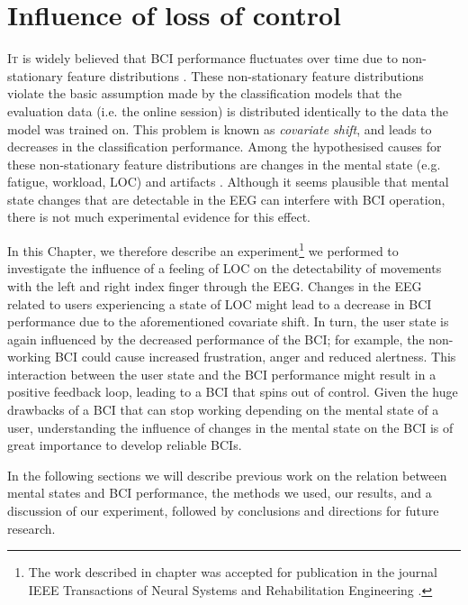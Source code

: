 \chapter{Influence of loss of control}
\label{chap:loc}

\lettrine{I}{t} is widely believed that \ac{BCI} performance fluctuates over
time due to non-stationary feature distributions \cite{mueller2008mlr,
blankertz2007ics, bunau2009ssa, vidal1977rtd, shenoy2006tac, krauledat2008tzt,
sun2006afe, wolpaw2002bci, jatzev2008ecn}. These non-stationary feature
distributions violate the basic assumption made by the classification models
that the evaluation data (i.e. the online session) is distributed identically
to the data the model was trained on. This problem is known as \emph{covariate shift}, and leads to decreases in the classification performance.
%
Among the hypothesised causes for these non-stationary feature distributions
are changes in the mental state (e.g. fatigue, workload, \ac{LOC}) and
artifacts \cite{blankertz2007ics, jatzev2008ecn}.
%
Although it seems plausible that mental state changes that are detectable in
the \ac{EEG} can interfere with \ac{BCI} operation, there is not much
experimental evidence for this effect. 

In this Chapter, we therefore describe an experiment\footnote{ The work
described in chapter was accepted for publication in the journal IEEE
Transactions of Neural Systems and Rehabilitation Engineering
\cite{reuderink2011ilc}.} we performed to investigate the influence of a
feeling of \ac{LOC} on the detectability of movements with the left and right
index finger through the \ac{EEG}. 
%
Changes in the \ac{EEG} related to users experiencing a state of \ac{LOC} might
lead to a decrease in \ac{BCI} performance due to the aforementioned covariate
shift. In turn, the user state is again influenced by the decreased performance
of the \ac{BCI}; for example, the non-working \ac{BCI} could cause increased
frustration, anger and reduced alertness. This interaction between the user
state and the \ac{BCI} performance might result in a positive feedback loop,
leading to a \ac{BCI} that spins out of control.
%
Given the huge drawbacks of a \ac{BCI} that can stop working depending on the
mental state of a user, understanding the influence of changes in the mental
state on the \ac{BCI} is of great importance to develop reliable \acp{BCI}.

In the following sections we will describe previous work on the relation between
mental states and \ac{BCI} performance, the methods we used, our results, and a
discussion of our experiment, followed by conclusions and directions for future
research.




\glsresetall

